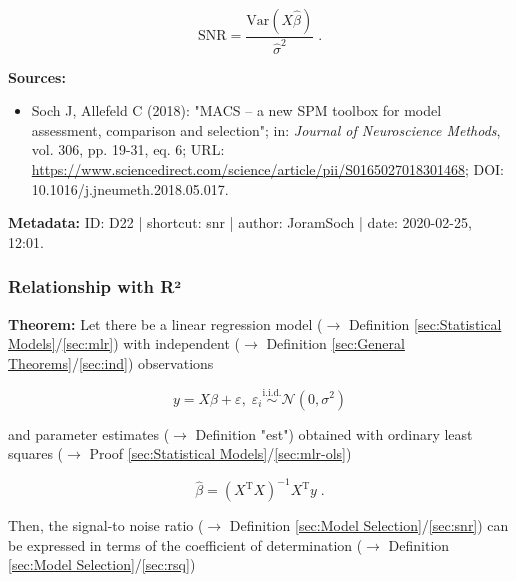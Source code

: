 \documentclass[a4paper,12pt,twoside]{book}
\begin{document}
\begin{equation} \label{eq:snr-SNR}
\mathrm{SNR} = \frac{\mathrm{Var}(X\hat{\beta})}{\hat{\sigma}^2} \; .
\end{equation}


\vspace{1em}
\textbf{Sources:}
\begin{itemize}
\item Soch J, Allefeld C (2018): "MACS – a new SPM toolbox for model assessment, comparison and selection"; in: \textit{Journal of Neuroscience Methods}, vol. 306, pp. 19-31, eq. 6; URL: \url{https://www.sciencedirect.com/science/article/pii/S0165027018301468}; DOI: 10.1016/j.jneumeth.2018.05.017.
\end{itemize}


\vspace{1em}
\textbf{Metadata:} ID: D22 | shortcut: snr | author: JoramSoch | date: 2020-02-25, 12:01.
\vspace{1em}



\subsubsection[\textbf{Relationship with R²}]{Relationship with R²} \label{sec:snr-rsq}
\setcounter{equation}{0}

\textbf{Theorem:} Let there be a linear regression model ($\rightarrow$ Definition \ref{sec:Statistical Models}/\ref{sec:mlr}) with independent ($\rightarrow$ Definition \ref{sec:General Theorems}/\ref{sec:ind}) observations

\begin{equation} \label{eq:snr-rsq-mlr}
y = X\beta + \varepsilon, \; \varepsilon_i \overset{\mathrm{i.i.d.}}{\sim} \mathcal{N}(0, \sigma^2)
\end{equation}

and parameter estimates ($\rightarrow$ Definition "est") obtained with ordinary least squares ($\rightarrow$ Proof \ref{sec:Statistical Models}/\ref{sec:mlr-ols})

\begin{equation} \label{eq:snr-rsq-OLS}
\hat{\beta} = (X^\mathrm{T} X)^{-1} X^\mathrm{T} y \; .
\end{equation}

Then, the signal-to noise ratio ($\rightarrow$ Definition \ref{sec:Model Selection}/\ref{sec:snr}) can be expressed in terms of the coefficient of determination ($\rightarrow$ Definition \ref{sec:Model Selection}/\ref{sec:rsq})
\end{document}
